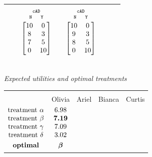 \documentclass[utf8]{FrontiersinHarvard} %
\renewcommand*{\|}[1][]{\nonscript\:#1\vert\nonscript\:\mathopen{}}
\newcommand*{\cad}{\texttt{cAD}}
\newcommand*{\yes}{\texttt{Y}}
\newcommand*{\no}{\texttt{N}}
\begin{document}
\begin{table}[!h]
\begin{tabular}{lccccccc}
    &&
    $\begin{gathered}
      {\scriptstyle\cad}\\[-2\jot]
      \begin{smallmatrix}
        \no\enspace &\enspace\yes
      \end{smallmatrix}\\[-\jot]
      \begin{bmatrix}10&0\\8&3\\7&5\\0&10\end{bmatrix}\end{gathered}$
    &&
    $\begin{gathered}
      {\scriptstyle\cad}\\[-2\jot]
      \begin{smallmatrix}
        \no\enspace &\enspace\yes
      \end{smallmatrix}\\[-\jot]
      \begin{bmatrix}10&0\\9&3\\8&5\\0&10\end{bmatrix}\end{gathered}$
    \\[6\jot]
    \hline
  \end{tabular}
\\[1em]
  \textit{Expected utilities and optimal treatments}\\
  \begin{tabular}{lcccc}
    \hline\\[-1.5\jot]
    &{\small Olivia} &{\small Ariel} &{\small Bianca} &{\small Curtis}
    \\[\jot]
    $\begin{matrix}
      \text{treatment }\alpha\\ 
      \text{treatment }\beta\\ 
      \text{treatment }\gamma\\ 
      \text{treatment }\delta\\[\jot]
      \textbf{optimal}
    \end{matrix}$
    &
    $\begin{matrix}6.98\\\bm{7.19}\\7.09\\3.02\\[\jot]\bm{\beta}\end{matrix}$

\end{tabular}
\end{table}
\end{document}
